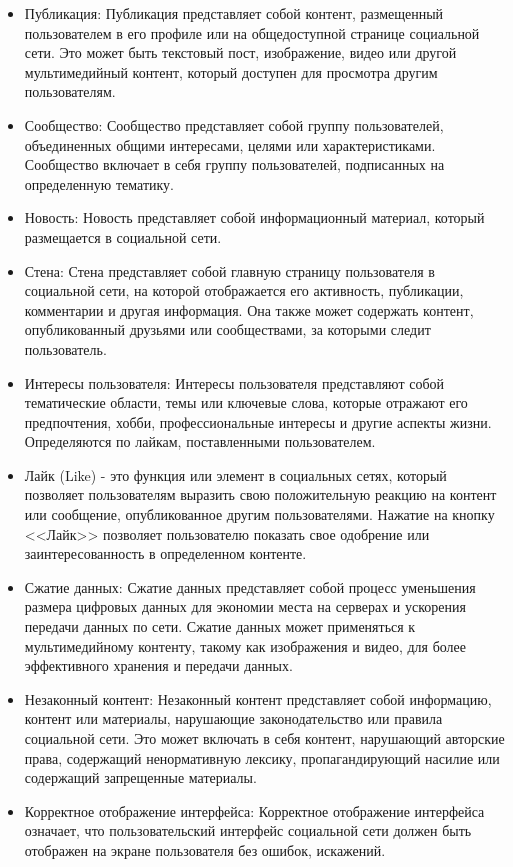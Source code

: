 \begin{itemize}
\item Публикация:
   Публикация представляет собой контент, размещенный пользователем в его профиле или на общедоступной странице социальной сети. Это может быть текстовый пост, изображение, видео или другой мультимедийный контент, который доступен для просмотра другим пользователям.
 \item Сообщество:
 Сообщество представляет собой группу пользователей, объединенных общими интересами, целями или характеристиками. Сообщество включает в себя группу пользователей, подписанных на определенную тематику.
\item Новость:
   Новость представляет собой информационный материал, который размещается в социальной сети.
\item Стена:
   Стена представляет собой главную страницу пользователя в социальной сети, на которой отображается его активность, публикации, комментарии и другая информация. Она также может содержать контент, опубликованный друзьями или сообществами, за которыми следит пользователь.
 \item Интересы пользователя:
  Интересы пользователя представляют собой тематические области, темы или ключевые слова, которые отражают его предпочтения, хобби, профессиональные интересы и другие аспекты жизни.  Определяются по лайкам, поставленными пользователем.
\item Лайк (Like) - это функция или элемент в социальных сетях, который позволяет пользователям выразить свою положительную реакцию на контент или сообщение, опубликованное другим пользователями. Нажатие на кнопку <<Лайк>> позволяет пользователю показать свое одобрение или заинтересованность в определенном контенте.
\item Сжатие данных:
  Сжатие данных представляет собой процесс уменьшения размера цифровых данных для экономии места на серверах и ускорения передачи данных по сети. Сжатие данных может применяться к мультимедийному контенту, такому как изображения и видео, для более эффективного хранения и передачи данных.
\item Незаконный контент:
  Незаконный контент представляет собой информацию, контент или материалы, нарушающие законодательство или правила социальной сети. Это может включать в себя контент, нарушающий авторские права, содержащий ненормативную лексику, пропагандирующий насилие или содержащий запрещенные материалы.

\item Корректное отображение интерфейса:
  Корректное отображение интерфейса означает, что пользовательский интерфейс социальной сети должен быть отображен на экране пользователя без ошибок, искажений.
\end{itemize}
